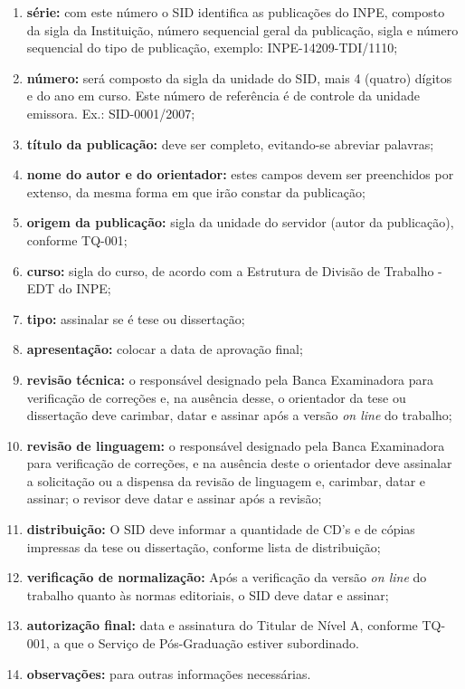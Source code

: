 \begin{enumerate} 

 \item \textbf{série:} com este número o SID identifica as publicações do INPE, composto da sigla da Instituição, número sequencial geral da publicação, sigla e número sequencial do tipo de publicação, exemplo: INPE-14209-TDI/1110;
 
 \item \textbf{número:} será composto da sigla da unidade do SID, mais 4 (quatro) dígitos e do ano em curso. Este número de referência é de controle da unidade emissora. Ex.: SID-0001/2007;

 \item \textbf{título da publicação:} deve ser completo, evitando-se abreviar palavras;

 \item \textbf{nome do autor e do orientador:} estes campos devem ser preenchidos por extenso, da mesma forma em que irão constar da publicação;

 \item \textbf{origem da publicação:} sigla da unidade do servidor (autor da publicação), conforme TQ-001;

 \item \textbf{curso:} sigla do curso, de acordo com a Estrutura de Divisão de Trabalho - EDT do INPE;
 
 \item \textbf{tipo:} assinalar se é tese ou dissertação;

 \item \textbf{apresentação:} colocar a data de aprovação final;

 \item \textbf{revisão técnica:} o responsável designado pela Banca Examinadora para verificação de correções e, na ausência desse, o orientador da tese ou dissertação deve
carimbar, datar e assinar após a versão \emph{on line} do trabalho;

 \item \textbf{revisão de linguagem:} o responsável designado pela Banca Examinadora para verificação de correções, e na ausência deste o orientador deve assinalar a solicitação ou a dispensa da revisão de linguagem e, carimbar, datar e assinar; o revisor deve datar e assinar após a revisão;
 
 \item \textbf{distribuição:} O SID deve informar a quantidade de CD's e de cópias impressas da tese ou dissertação, conforme lista de distribuição;
 
 \item \textbf{verificação de normalização:}  Após a verificação da versão \emph{on line} do trabalho quanto às normas editoriais, o SID deve datar e assinar;
 
 \item \textbf{autorização final:} data e assinatura do Titular de Nível A, conforme TQ-001, a que o Serviço de Pós-Graduação estiver subordinado.
 
 \item \textbf{observações:} para outras informações necessárias. 

\end{enumerate}

